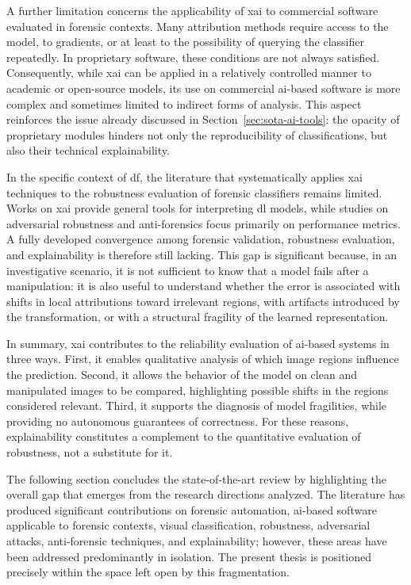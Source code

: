 A further limitation concerns the applicability of \gls{xai} to commercial
software evaluated in forensic contexts. Many attribution methods require
access to the model, to gradients, or at least to the possibility of querying
the classifier repeatedly. In proprietary software, these conditions are not
always satisfied. Consequently, while \gls{xai} can be applied in a relatively
controlled manner to academic or open-source models, its use on commercial
\gls{ai}-based software is more complex and sometimes limited to indirect forms
of analysis. This aspect reinforces the issue already discussed in
Section~\ref{sec:sota-ai-tools}: the opacity of proprietary modules hinders not
only the reproducibility of classifications, but also their technical
explainability.

In the specific context of \gls{df}, the literature that systematically applies
\gls{xai} techniques to the robustness evaluation of forensic classifiers
remains limited. Works on \gls{xai} provide general tools for interpreting
\gls{dl} models, while studies on adversarial robustness and anti-forensics
focus primarily on performance metrics. A fully developed convergence among
forensic validation, robustness evaluation, and explainability is therefore
still lacking. This gap is significant because, in an investigative scenario,
it is not sufficient to know that a model fails after a manipulation: it is
also useful to understand whether the error is associated with shifts in local
attributions toward irrelevant regions, with artifacts introduced by the
transformation, or with a structural fragility of the learned representation.

In summary, \gls{xai} contributes to the reliability evaluation of
\gls{ai}-based systems in three ways. First, it enables qualitative analysis of
which image regions influence the prediction. Second, it allows the behavior of
the model on clean and manipulated images to be compared, highlighting possible
shifts in the regions considered relevant. Third, it supports the diagnosis of
model fragilities, while providing no autonomous guarantees of correctness. For
these reasons, explainability constitutes a complement to the quantitative
evaluation of robustness, not a substitute for it.

The following section concludes the state-of-the-art review by highlighting the
overall gap that emerges from the research directions analyzed. The literature
has produced significant contributions on forensic automation, \gls{ai}-based
software applicable to forensic contexts, visual classification, robustness,
adversarial attacks, anti-forensic techniques, and explainability; however,
these areas have been addressed predominantly in isolation. The present thesis
is positioned precisely within the space left open by this fragmentation.



